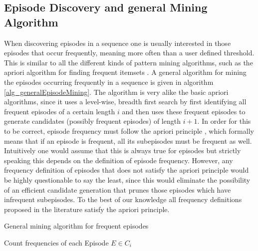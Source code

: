 \subsection{Episode Discovery and general Mining Algorithm}
\label{subsec_episodeDiscovery}
When discovering episodes in a sequence one is usually interested in those episodes that occur frequently, meaning more often than a user defined threshold. This is similar to all the different kinds of pattern mining algorithms, such as the apriori algorithm for finding frequent itemsets \cite{agrawal1994fast}. A general algorithm for mining the episodes occurring frequently in a sequence is given in algorithm \ref{alg_generalEpisodeMining}. The algorithm is very alike the basic apriori algorithms, since it uses a level-wise, breadth first search by first identifying all frequent episodes of a certain length $i$ and then uses these frequent episodes to generate candidates (possibly frequent episodes) of length $i+1$. In order for this to be correct, episode frequency must follow the apriori principle \cite{agrawal1994fast}, which formally means that if an episode is frequent, all its subepisodes must be frequent as well. Intuitively one would assume that this is always true for episodes but strictly speaking this depends on the definition of episode frequency. However, any frequency definition of episodes that does not satisfy the apriori principle would be highly questionable to say the least, since this would eliminate the possibility of an efficient candidate generation that prunes those episodes which have infrequent subepisodes. To the best of our knowledge all frequency definitions proposed in the literature satisfy the apriori principle.\newline

\begin{algorithm}[H]
  \caption{General mining algorithm for frequent episodes
    \label{alg_generalEpisodeMining}}
  \begin{algorithmic}[1]
    \Statex
      	\State Count frequencies of each Episode $E \in C_i$
      \EndWhile
      \State {}
    \EndFunction
  \end{algorithmic}
\end{algorithm}


